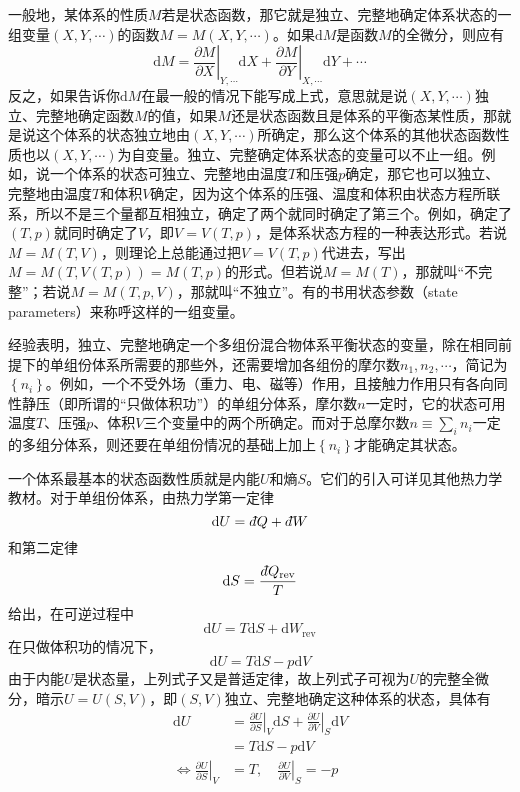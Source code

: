 \documentclass[main.tex]{subfiles}
\begin{document}
一般地，某体系的性质$M$若是状态函数，那它就是独立、完整地确定体系状态的一组变量$\left(X,Y,\cdots\right)$的函数$M=M\left(X,Y,\cdots\right)$。如果$\mathrm{d}M$是函数$M$的全微分，则应有
\[\mathrm{d}M=\left.\frac{\partial M}{\partial X}\right|_{Y,\cdots}\mathrm{d}X+\left.\frac{\partial M}{\partial Y}\right|_{X,\cdots}\mathrm{d}Y+\cdots\]
反之，如果告诉你$\mathrm{d}M$在最一般的情况下能写成上式，意思就是说$\left(X,Y,\cdots\right)$独立、完整地确定函数$M$的值，如果$M$还是状态函数且是体系的平衡态某性质，那就是说这个体系的状态独立地由$\left(X,Y,\cdots\right)$所确定，那么这个体系的其他状态函数性质也以$\left(X,Y,\cdots\right)$为自变量。独立、完整确定体系状态的变量可以不止一组。例如，说一个体系的状态可独立、完整地由温度$T$和压强$p$确定，那它也可以独立、完整地由温度$T$和体积$V$确定，因为这个体系的压强、温度和体积由状态方程所联系，所以不是三个量都互相独立，确定了两个就同时确定了第三个。例如，确定了$\left(T,p\right)$就同时确定了$V$，即$V=V\left(T,p\right)$，是体系状态方程的一种表达形式。若说$M=M\left(T,V\right)$，则理论上总能通过把$V=V\left(T,p\right)$代进去，写出$M=M\left(T,V\left(T,p\right)\right)=M\left(T,p\right)$的形式。但若说$M=M\left(T\right)$，那就叫“不完整”；若说$M=M\left(T,p,V\right)$，那就叫“不独立”。有的书用状态参数（state parameters）来称呼这样的一组变量。

经验表明，独立、完整地确定一个多组份混合物体系平衡状态的变量，除在相同前提下的单组份体系所需要的那些外，还需要增加各组份的摩尔数$n_1,n_2,\cdots$，简记为$\left\{n_i\right\}$。例如，一个不受外场（重力、电、磁等）作用，且接触力作用只有各向同性静压（即所谓的“只做体积功”）的单组分体系，摩尔数$n$一定时，它的状态可用温度$T$、压强$p$、体积$V$三个变量中的两个所确定。而对于总摩尔数$n\equiv\sum_in_i$一定的多组分体系，则还要在单组份情况的基础上加上$\left\{n_i\right\}$才能确定其状态。

一个体系最基本的状态函数性质就是内能$U$和熵$S$。它们的引入可详见其他热力学教材。对于单组份体系，由热力学第一定律
\[\mathrm{d}U=d\hspace*{-0.08em}\bar{}\hspace*{0.1em} Q+d\hspace*{-0.08em}\bar{}\hspace*{0.1em} W\]
和第二定律
\[\mathrm{d} S=\frac{d\hspace*{-0.08em}\bar{}\hspace*{0.1em} Q_\text{rev}}{T}\]
给出，在可逆过程中
\[\mathrm{d}U=T\mathrm{d}S+\mathrm{d}W_\text{rev}\]
在只做体积功的情况下，
\[\mathrm{d}U=T\mathrm{d}S-p\mathrm{d}V\]
由于内能$U$是状态量，上列式子又是普适定律，故上列式子可视为$U$的完整全微分，暗示$U=U\left(S,V\right)$，即$\left(S,V\right)$独立、完整地确定这种体系的状态，具体有
\begin{align*}
    \mathrm{d}U                                                   & =\left.\frac{\partial U}{\partial S}\right|_V\mathrm{d}S+\left.\frac{\partial U}{\partial V}\right|_{S}\mathrm{d}V \\
                                                                  & =T\mathrm{d}S-p\mathrm{d}V                                                                                         \\
    \Leftrightarrow\left.\frac{\partial U}{\partial S}\right|_{V} & =T,\quad\left.\frac{\partial U}{\partial V}\right|_{S}=-p
\end{align*}
\end{document}

